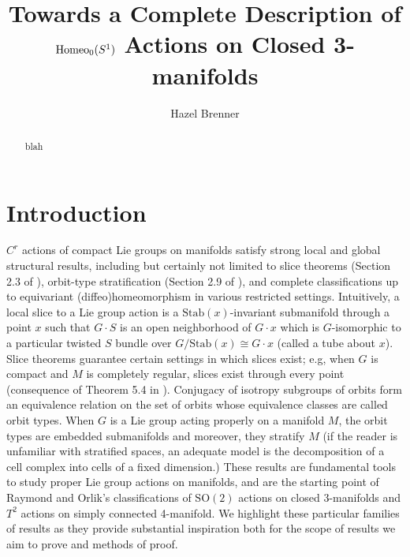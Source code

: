 \documentclass[10pt, oneside]{article}
\title{Towards a Complete Description of $\text{Homeo}_0(S^1)$ Actions on Closed 3-manifolds}
\author{Hazel Brenner}
\newcommand{\SO}[1][2]{\text{SO}(#1)}
\newcommand{\stab}[1]{\text{Stab}(#1)}
\theoremstyle{definition}
\theoremstyle{definition}
\begin{document}
\maketitle
\listoftodos
\tableofcontents
\begin{abstract}
    blah
\end{abstract}
\section{Introduction}\label{sec:intro}

$C^r$ actions of compact Lie groups on manifolds satisfy strong local and global structural results, including but certainly not limited to slice theorems (Section 2.3 of \cite{duistermaat:LieGroups}), orbit-type stratification (Section 2.9 of \cite{duistermaat:LieGroups}), and complete classifications up to equivariant (diffeo)homeomorphism in various restricted settings. Intuitively, a local slice to a Lie group action is a $\stab{x}$-invariant submanifold through a point $x$ such that $G\cdot S$ is an open neighborhood of $G\cdot x$ which is $G$-isomorphic to a particular twisted $S$ bundle over $G/\stab{x}\cong G\cdot x$ (called a tube about $x$). Slice theorems guarantee certain settings in which slices exist; e.g, when $G$ is compact and $M$ is completely regular, slices exist through every point (consequence of Theorem 5.4 in \cite{bredon:IntroductionCompact}). Conjugacy of isotropy subgroups of orbits form an equivalence relation on the set of orbits whose equivalence classes are called orbit types. When $G$ is a Lie group acting properly on a manifold $M$, the orbit types are embedded submanifolds and moreover, they stratify $M$ (if the reader is unfamiliar with stratified spaces, an adequate model is the decomposition of a cell complex into cells of a fixed dimension.) These results are fundamental tools to study proper Lie group actions on manifolds, and are the starting point of Raymond and Orlik's classifications of $\SO$ actions on closed 3-manifolds and $T^2$ actions on simply connected 4-manifold\cite{orlik:ActionsSO2,orlik:ActionsTorusI, orlik:ActionsTorusII}.
We highlight these particular families of results as they provide substantial inspiration both for the scope of results we aim to prove and methods of proof.
\end{document}
